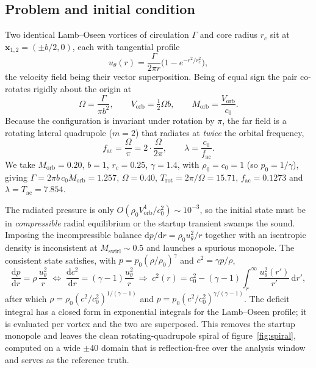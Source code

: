 \documentclass{jfm}
\newcommand{\dd}{\mathrm{d}}
\newcommand{\xv}{\bm{x}}
\begin{document}
\subsection{Problem and initial condition}
Two identical Lamb--Oseen vortices of circulation $\Gamma$ and core radius $r_c$
sit at $\xv_{1,2}=(\pm b/2,0)$, each with tangential profile
\begin{equation}
u_\theta(r)=\frac{\Gamma}{2\pi r}\Big(1-e^{-r^2/r_c^2}\Big),
\end{equation}
the velocity field being their vector superposition. Being of equal sign the
pair co-rotates rigidly about the origin at
\begin{equation}
\Omega=\frac{\Gamma}{\pi b^2},\qquad
V_{\mathrm{orb}}=\tfrac12\Omega b,\qquad
M_{\mathrm{orb}}=\frac{V_{\mathrm{orb}}}{c_0}.
\end{equation}
Because the configuration is invariant under rotation by $\pi$, the far field is
a rotating lateral quadrupole ($m=2$) that radiates at \emph{twice} the orbital
frequency,
\begin{equation}
f_{\mathrm{ac}}=\frac{\Omega}{\pi}=2\cdot\frac{\Omega}{2\pi},\qquad
\lambda=\frac{c_0}{f_{\mathrm{ac}}}.
\end{equation}
We take $M_{\mathrm{orb}}=0.20$, $b=1$, $r_c=0.25$, $\gamma=1.4$, with
$\rho_0=c_0=1$ (so $p_0=1/\gamma$), giving $\Gamma=2\pi b\,c_0M_{\mathrm{orb}}
=1.257$, $\Omega=0.40$, $T_{\mathrm{rot}}=2\pi/\Omega=15.71$,
$f_{\mathrm{ac}}=0.1273$ and $\lambda=T_{\mathrm{ac}}=7.854$.

The radiated pressure is only $O(\rho_0V_{\mathrm{orb}}^4/c_0^2)\sim10^{-3}$, so
the initial state must be in \emph{compressible} radial equilibrium or the
startup transient swamps the sound. Imposing the incompressible balance
$\dd p/\dd r=\rho_0u_\theta^2/r$ together with an isentropic density is
inconsistent at $M_{\mathrm{swirl}}\sim0.5$ and launches a spurious monopole.
The consistent state satisfies, with $p=p_0(\rho/\rho_0)^\gamma$ and
$c^2=\gamma p/\rho$,
\begin{equation}
\frac{\dd p}{\dd r}=\rho\,\frac{u_\theta^2}{r}
\;\Longleftrightarrow\;
\frac{\dd c^2}{\dd r}=(\gamma-1)\frac{u_\theta^2}{r}
\;\Longrightarrow\;
c^2(r)=c_0^2-(\gamma-1)\!\int_r^\infty\!\frac{u_\theta^2(r')}{r'}\,\dd r',
\label{eq:csq}
\end{equation}
after which $\rho=\rho_0(c^2/c_0^2)^{1/(\gamma-1)}$ and
$p=p_0(c^2/c_0^2)^{\gamma/(\gamma-1)}$. The deficit integral has a closed form
in exponential integrals for the Lamb--Oseen profile; it is evaluated per vortex
and the two are superposed. This removes the startup monopole and leaves the
clean rotating-quadrupole spiral of figure~\ref{fig:spiral}, computed on a wide
$\pm40$ domain that is reflection-free over the analysis window and serves as
the reference truth.
\end{document}
